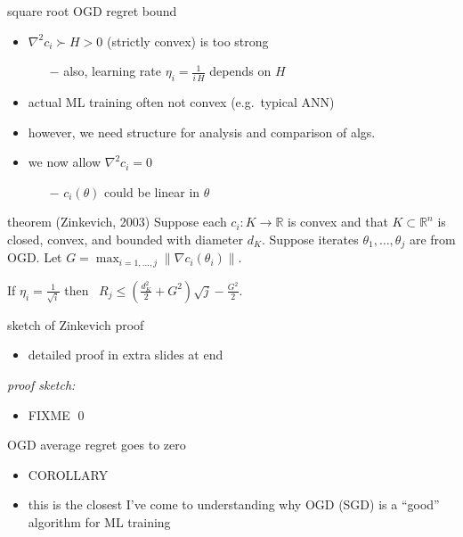 \documentclass[xcolor={svgnames},
               hyperref={colorlinks,citecolor=DeepPink4,linkcolor=FireBrick,urlcolor=Maroon}]
               {beamer}
\newcommand{\grad}{\nabla}
\newcommand{\RR}{\mathbb{R}}
\newcommand{\ds}{\displaystyle}
\begin{document}
\begin{frame}{square root OGD regret bound}

\begin{itemize}
\item $\grad^2 c_i \succ H > 0$ (strictly convex) is too strong
    \begin{itemize}
    \item[$-$] also, learning rate $\eta_i = \frac{1}{i\,H}$ depends on $H$
    \end{itemize}
\item actual ML training often not convex (e.g.~typical ANN)
\item however, we need structure for analysis and comparison of algs.
\item we now allow $\grad^2 c_i = 0$
    \begin{itemize}
    \item[$-$] $c_i(\theta)$ could be linear in $\theta$
    \end{itemize}
\end{itemize}

\begin{block}{theorem (Zinkevich, 2003)}
Suppose each $c_i:K \to \RR$ is convex and that $K\subset \RR^n$ is closed, convex, and bounded with diameter $d_K$.  Suppose iterates $\theta_1,\dots,\theta_j$ are from OGD.  Let $G = \max_{i=1,\dots,j} \|\grad c_i(\theta_i)\|$.

If $\ds \eta_i = \frac{1}{\sqrt{i}}$ then \, $\ds \boxed{R_j \le \left(\frac{d_K^2}{2} + G^2\right) \sqrt{j} - \frac{G^2}{2}.}$
\end{block}
\end{frame}


\begin{frame}{sketch of Zinkevich proof}
\begin{itemize}
\item detailed proof in extra slides at end
\end{itemize}

\bigskip
\noindent \emph{proof sketch:}

\begin{itemize}
\item FIXME \hfill \qed
\end{itemize}
\end{frame}


\begin{frame}{OGD average regret goes to zero}

\begin{itemize}
\item COROLLARY
\item this is the closest I've come to understanding why OGD (SGD) is a ``good'' algorithm for ML training
\end{itemize}
\end{frame}
\end{document}
